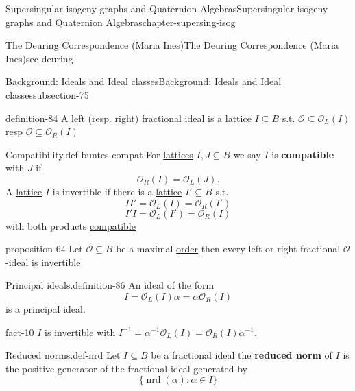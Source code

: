 \documentclass[oneside,10pt,]{book}
\newcommand{\terminology}[1]{\textbf{#1}}
\numberwithin{equation}{section}
\newcommand{\inv}{^{-1}}
\newcommand{\ints}{\mathcal{O}}
\begin{document}
\begin{chapterptx}{Supersingular isogeny graphs and Quaternion Algebras}{}{Supersingular isogeny graphs and Quaternion Algebras}{}{}{chapter-supersing-isog}
\begin{sectionptx}{The Deuring Correspondence (Maria Ines)}{}{The Deuring Correspondence (Maria Ines)}{}{}{sec-deuring}
\begin{subsectionptx}{Background: Ideals and Ideal classes}{}{Background: Ideals and Ideal classes}{}{}{subsection-75}
\begin{definition}{}{definition-84}%
\hypertarget{p-939}{}%
A left (resp. right) fractional ideal is a \hyperref[def-buntes-lattice]{lattice} \(I \subseteq B\) s.t. \(\ints \subseteq       \ints_L (I) \) resp \(\ints \subseteq \ints_R (I) \)%
\end{definition}
\begin{definition}{Compatibility.}{def-buntes-compat}%
\hypertarget{p-940}{}%
For \hyperref[def-buntes-lattice]{lattices} \(I,J \subseteq B\) we say \(I\) is \terminology{compatible} with \(J\) if%
\begin{equation*}
\ints_R(I)= \ints_L(J)\text{.}
\end{equation*}
A \hyperref[def-buntes-lattice]{lattice} \(I \) is invertible if there is a \hyperref[def-buntes-lattice]{lattice} \(I' \subseteq B\) s.t.%
\begin{equation*}
II' = \ints_L(I) =  \ints_R(I')
\end{equation*}
%
\begin{equation*}
I'I = \ints_L(I') =  \ints_R(I)
\end{equation*}
with both products \hyperref[def-buntes-compat]{compatible}%
\end{definition}
\begin{proposition}{}{}{proposition-64}%
\hypertarget{p-941}{}%
Let \(\ints \subseteq B\) be a maximal \hyperref[def-order-quaternion]{order} then every left or right fractional \(\ints\)-ideal is invertible.%
\end{proposition}
\begin{definition}{Principal ideals.}{definition-86}%
\hypertarget{p-942}{}%
An ideal of the form%
\begin{equation*}
I =  \ints_L(I) \alpha =  \alpha\ints_R(I)
\end{equation*}
is a principal ideal.%
\end{definition}
\begin{fact}{}{}{fact-10}%
\hypertarget{p-943}{}%
\(I \) is invertible with \(I\inv = \alpha \inv \ints_L(I) =  \ints_R(I) \alpha \inv\).%
\end{fact}
\begin{definition}{Reduced norms.}{def-nrd}%
\hypertarget{p-944}{}%
Let \(I \subseteq B\) be a fractional ideal the \terminology{reduced norm} of \(I \) is the positive generator of the fractional ideal generated by%
\begin{equation*}
\{ \operatorname{nrd} (\alpha) :  \alpha \in I \}
\end{equation*}

\end{definition}
\end{subsectionptx}
\end{sectionptx}
\end{chapterptx}
\end{document}
